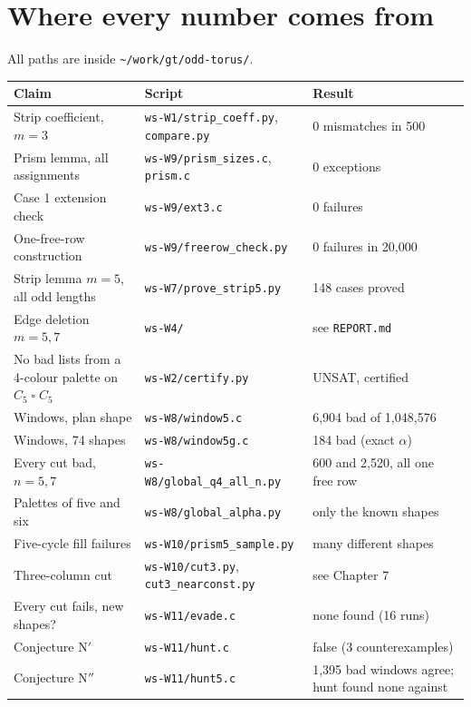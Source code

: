 \documentclass[11pt,oneside,openany]{book}
\newcommand{\T}{\mathbin{\square}}
\begin{document}
\appendix
\chapter{Where every number comes from}\label{app:verify}

All paths are inside \texttt{\textasciitilde/work/gt/odd-torus/}.

\begin{center}\small
\renewcommand{\arraystretch}{1.2}
\begin{tabular}{p{5.6cm}p{4.6cm}p{3.6cm}}
\toprule
Claim & Script & Result \\
\midrule
Strip coefficient, $m=3$ & \texttt{ws-W1/strip\_coeff.py}, \texttt{compare.py} & 0 mismatches in 500 \\
Prism lemma, all assignments & \texttt{ws-W9/prism\_sizes.c}, \texttt{prism.c} & 0 exceptions \\
Case 1 extension check & \texttt{ws-W9/ext3.c} & 0 failures \\
One-free-row construction & \texttt{ws-W9/freerow\_check.py} & 0 failures in 20,000 \\
Strip lemma $m=5$, all odd lengths & \texttt{ws-W7/prove\_strip5.py} & 148 cases proved \\
Edge deletion $m=5,7$ & \texttt{ws-W4/} & see \texttt{REPORT.md} \\
No bad lists from a 4-colour palette on $C_5 \T C_5$ & \texttt{ws-W2/certify.py} & UNSAT, certified \\
Windows, plan shape & \texttt{ws-W8/window5.c} & 6,904 bad of 1,048,576 \\
Windows, 74 shapes & \texttt{ws-W8/window5g.c} & 184 bad (exact $\alpha$) \\
Every cut bad, $n=5,7$ & \texttt{ws-W8/global\_q4\_all\_n.py} & 600 and 2,520, all one free row \\
Palettes of five and six & \texttt{ws-W8/global\_alpha.py} & only the known shapes \\
Five-cycle fill failures & \texttt{ws-W10/prism5\_sample.py} & many different shapes \\
Three-column cut & \texttt{ws-W10/cut3.py}, \texttt{cut3\_nearconst.py} & see Chapter 7 \\
Every cut fails, new shapes? & \texttt{ws-W11/evade.c} & none found (16 runs) \\
Conjecture N$'$ & \texttt{ws-W11/hunt.c} & false (3 counterexamples) \\
Conjecture N$''$ & \texttt{ws-W11/hunt5.c} & 1,395 bad windows agree; hunt found none against \\

\end{tabular}
\end{center}
\end{document}
